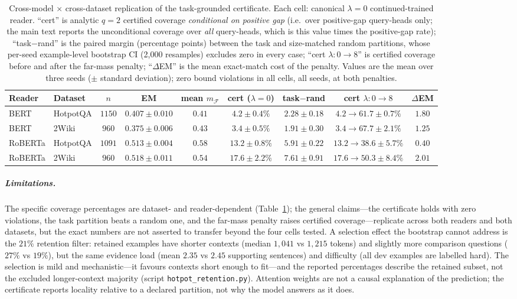 \documentclass[10pt,twocolumn]{article}
\begin{document}
\begin{table}[t]
\centering
\small
\caption{Cross-model $\times$ cross-dataset replication of the task-grounded certificate. Each cell: canonical $\lambda{=}0$ continued-trained reader. ``cert'' is analytic $q{=}2$ certified coverage \emph{conditional on positive gap} (i.e.\ over positive-gap query-heads only; the main text reports the unconditional coverage over \emph{all} query-heads, which is this value times the positive-gap rate); ``task$-$rand'' is the paired margin (percentage points) between the task and size-matched random partitions, whose per-seed example-level bootstrap CI (2{,}000 resamples) excludes zero in every case; ``cert $\lambda{:}0{\to}8$'' is certified coverage before and after the far-mass penalty; ``$\Delta$EM'' is the mean exact-match cost of the penalty. Values are the mean over three seeds ($\pm$ standard deviation); zero bound violations in all cells, all seeds, at both penalties.}
\label{tab:replication}
\begin{tabular}{llccccccc}
\toprule
Reader & Dataset & $n$ & EM & mean $m_{\mathcal{F}}$ & cert ($\lambda{=}0$) & task$-$rand & cert $\lambda{:}0{\to}8$ & $\Delta$EM \\
\midrule
BERT    & HotpotQA & $1150$ & $0.407{\pm}0.010$ & $0.41$ & $4.2{\pm}0.4\%$   & $2.28{\pm}0.18$ & $4.2{\to}61.7{\pm}0.7\%$   & $1.80$ \\
BERT    & 2Wiki    & $960$  & $0.375{\pm}0.006$ & $0.43$ & $3.4{\pm}0.5\%$   & $1.91{\pm}0.30$ & $3.4{\to}67.7{\pm}2.1\%$   & $1.25$ \\
RoBERTa & HotpotQA & $1091$ & $0.513{\pm}0.004$ & $0.58$ & $13.2{\pm}0.8\%$  & $5.91{\pm}0.22$ & $13.2{\to}38.6{\pm}5.7\%$  & $0.40$ \\
RoBERTa & 2Wiki    & $960$  & $0.518{\pm}0.011$ & $0.54$ & $17.6{\pm}2.2\%$  & $7.61{\pm}0.91$ & $17.6{\to}50.3{\pm}8.4\%$  & $2.01$ \\
\bottomrule
\end{tabular}
\end{table}

\subparagraph{Limitations.} The specific coverage percentages are dataset- and reader-dependent (Table~\ref{tab:replication}); the general claims---the certificate holds with zero violations, the task partition beats a random one, and the far-mass penalty raises certified coverage---replicate across both readers and both datasets, but the exact numbers are not asserted to transfer beyond the four cells tested. A selection effect the bootstrap cannot address is the $21\%$ retention filter: retained examples have shorter contexts (median $1{,}041$ vs $1{,}215$ tokens) and slightly more comparison questions ($27\%$ vs $19\%$), but the same evidence load (mean $2.35$ vs $2.45$ supporting sentences) and difficulty (all dev examples are labelled hard). The selection is mild and mechanistic---it favours contexts short enough to fit---and the reported percentages describe the retained subset, not the excluded longer-context majority (script \texttt{hotpot\_retention.py}). Attention weights are not a causal explanation of the prediction; the certificate reports locality relative to a declared partition, not why the model answers as it does.
\end{document}
